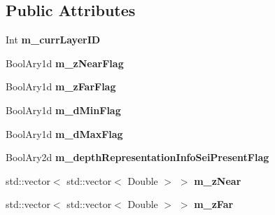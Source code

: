 \subsection*{Public Attributes}
\begin{DoxyCompactItemize}
\item 
\mbox{\label{class_s_e_i_depth_representation_info_a5d882561735137be5faac43f0d3f16e3}} 
Int {\bfseries m\+\_\+curr\+Layer\+ID}
\item 
\mbox{\label{class_s_e_i_depth_representation_info_a77812caa887422445fae3250c88b1443}} 
Bool\+Ary1d {\bfseries m\+\_\+z\+Near\+Flag}
\item 
\mbox{\label{class_s_e_i_depth_representation_info_ad81e66ba53d47433f88e9eeb61977a5c}} 
Bool\+Ary1d {\bfseries m\+\_\+z\+Far\+Flag}
\item 
\mbox{\label{class_s_e_i_depth_representation_info_a8c1a5f6cab12bc294ee51e44e10e00a7}} 
Bool\+Ary1d {\bfseries m\+\_\+d\+Min\+Flag}
\item 
\mbox{\label{class_s_e_i_depth_representation_info_adf43e6451751e413cbe19c339d339813}} 
Bool\+Ary1d {\bfseries m\+\_\+d\+Max\+Flag}
\item 
\mbox{\label{class_s_e_i_depth_representation_info_a523bb2943f49b5a5ab543ad4cc6a93b7}} 
Bool\+Ary2d {\bfseries m\+\_\+depth\+Representation\+Info\+Sei\+Present\+Flag}
\item 
\mbox{\label{class_s_e_i_depth_representation_info_a0bb8463ab0be63ca0ba2c28f9363fb0c}} 
std\+::vector$<$ std\+::vector$<$ Double $>$ $>$ {\bfseries m\+\_\+z\+Near}
\item 
\mbox{\label{class_s_e_i_depth_representation_info_ac0ad25e5d92b714b6699a09e923a2a4b}} 
std\+::vector$<$ std\+::vector$<$ Double $>$ $>$ {\bfseries m\+\_\+z\+Far}
\item 
\mbox{\label{class_s_e_i_depth_representation_info_abd024eb978fcb2d50e2b89c765e128e9}} 

\end{DoxyCompactItemize}
